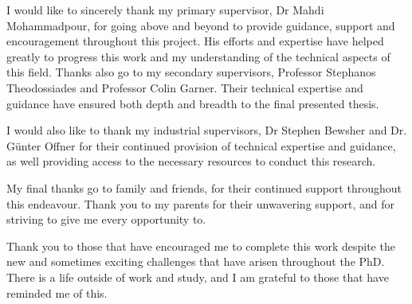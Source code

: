 
\begin{acknowledgements}      

I would like to sincerely thank my primary supervisor, Dr Mahdi Mohammadpour, for going above and beyond to provide guidance, support and encouragement throughout this project. His efforts and expertise have helped greatly to progress this work and my understanding of the technical aspects of this field. Thanks also go to my secondary supervisors, Professor Stephanos Theodossiades and Professor Colin Garner. Their technical expertise and guidance have ensured both depth and breadth to the final presented thesis.

I would also like to thank my industrial supervisors, Dr Stephen Bewsher and Dr. Günter Offner for their continued provision of technical expertise and guidance, as well providing access to the necessary resources to conduct this research.

My final thanks go to family and friends, for their continued support throughout this endeavour. Thank you to my parents for their unwavering support, and for striving to give me every opportunity to. 

Thank you to those that have encouraged me to complete this work despite the new and sometimes exciting challenges that have arisen throughout the PhD. There is a life outside of work and study, and I am grateful to those that have reminded me of this.

\end{acknowledgements}

